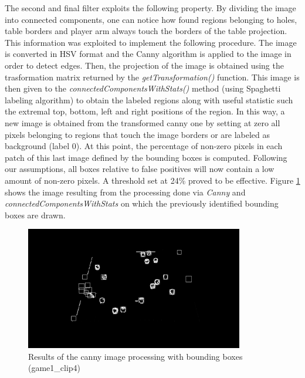 The second and final filter exploits the following property. By dividing the image into connected components, one can notice how found regions belonging to holes, table borders and player arm always
touch the borders of the table projection. This information was exploited to implement the following procedure.
The image is converted in HSV format and the Canny algorithm is applied to the image in order to detect edges.
Then, the projection of the image is obtained using the trasformation matrix returned by the \textit{getTransformation()} function.
This image is then given to the \textit{connectedComponentsWithStats()} method (using Spaghetti labeling algorithm) to obtain
the labeled regions along with useful statistic such the extremal top, bottom, left and right positions of the region.
In this way, a new image is obtained from the transformed canny one by setting at zero all pixels belonging to regions that touch the image
borders or are labeled as background (label 0).
At this point, the percentage of non-zero pixels in each patch of this last image defined by the bounding boxes is computed.
Following our assumptions, all boxes relative to false positives will now contain a low amount of non-zero pixels.
A threshold set at 24\% proved to be effective. Figure \ref{fig:cannyprocess} shows the image resulting from the processing done via \textit{Canny} and \textit{connectedComponentsWithStats}
on which the previously identified bounding boxes are drawn. 
\begin{figure}[h!]
    \centering
    \includegraphics[width=0.85\textwidth]{imgs/ball_localization/conn_comp1.jpg}
    \caption{Results of the canny image processing with bounding boxes (game1\_clip4)}
    \label{fig:cannyprocess}
\end{figure}

